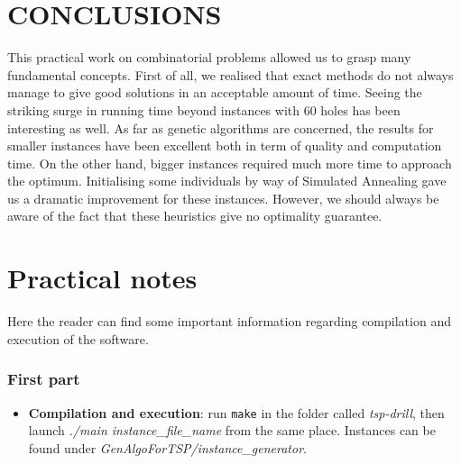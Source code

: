 \documentclass[letterpaper, 10 pt, conference]{ieeeconf}  %
\begin{document}
\section{CONCLUSIONS}
This practical work on combinatorial problems allowed us to grasp many fundamental concepts. First of all, we realised that exact methods do not always manage to give good solutions in an acceptable amount of time. Seeing the striking surge in running time beyond instances with 60 holes has been interesting as well. \newline 
As far as genetic algorithms are concerned, the results for smaller instances have been excellent both in term of quality and computation time. On the other hand, bigger instances required much more time to approach the optimum. Initialising some individuals by way of Simulated Annealing gave us a dramatic improvement for these instances. \newline However, we should always be aware of the fact that these heuristics give no optimality guarantee.


\addtolength{\textheight}{-12cm}   %







\section*{Practical notes}
Here the reader can find some important information regarding 
compilation and execution of the software.

\subsubsection{First part}
\renewcommand{\labelitemi}{$\star$}
\begin{itemize} 
\item \textbf{Compilation and execution}: run \texttt{make} in the folder called \textit{tsp-drill}, then launch \textit{./main instance\_file\_name}
from the same place. Instances can be found under \textit{GenAlgoForTSP/instance\_generator}.
\end{itemize}
\end{document}
